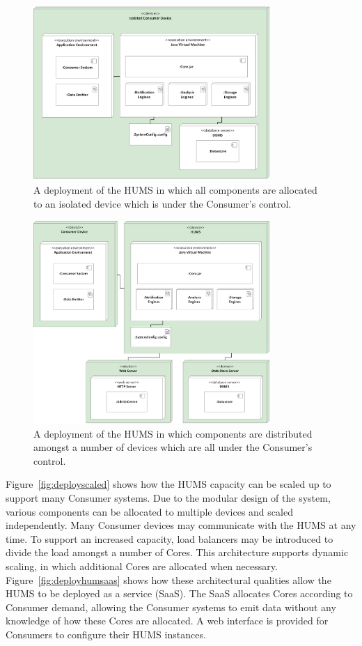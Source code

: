 \documentclass[10pt,a4paper]{article}
\begin{document}
\begin{figure}[htp]
  \centering
  \includegraphics[width=0.8\textwidth]{images/Isolated.png}
  \caption{A deployment of the HUMS in which all components are allocated to an isolated device which is under the Consumer's control.}
  \label{fig:deployisolated}
\end{figure}

\begin{figure}[htp]
  \centering
  \includegraphics[width=0.8\textwidth]{images/Distributed.png}
  \caption{A deployment of the HUMS in which components are distributed amongst a number of devices which are all under the Consumer's control.}
  \label{fig:deploydistributed}
\end{figure}

Figure~\ref{fig:deployscaled} shows how the HUMS capacity can be scaled up to support many Consumer systems. Due to the modular design of the system, various components can be allocated to multiple devices and scaled independently. Many Consumer devices may communicate with the HUMS at any time. To support an increased capacity, load balancers may be introduced to divide the load amongst a number of Cores. This architecture supports dynamic scaling, in which additional Cores are allocated when necessary. Figure~\ref{fig:deployhumsaas} shows how these architectural qualities allow the HUMS to be deployed as a service (SaaS). The SaaS allocates Cores according to Consumer demand, allowing the Consumer systems to emit data without any knowledge of how these Cores are allocated. A web interface is provided for Consumers to configure their HUMS instances.
\end{document}

